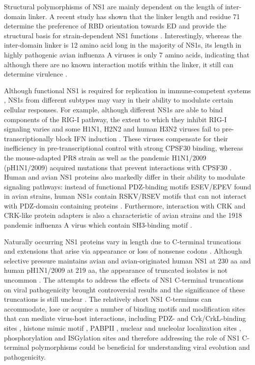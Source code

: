 		Structural polymorphisms of \gls{NS1} are mainly dependent on the length of inter-domain linker. A recent study has shown that the linker length and residue 71 determine the preference of \gls{RBD} orientation towards \gls{ED} and provide the structural basis for strain-dependent \gls{NS1} functions \parencite{Carrillo2014}. Interestingly, whereas the inter-domain linker is 12 amino acid long in the majority of \gls{NS1}s, its length in highly pathogenic avian influenza A viruses is only 7 amino acids, indicating that although there are no known interaction motifs within the linker, it still can determine virulence \parencite{Long2008}.
		
		Although functional \gls{NS1} is required for replication in immune-competent systems \parencite{Garcia-Sastre1998, Donelan2003}, \gls{NS1}s from different subtypes may vary in their ability to modulate certain cellular responses. For example, although different \gls{NS1}s are able to bind components of the \gls{RIG-I} pathway, the extent to which they inhibit \gls{RIG-I} signaling varies and some H1N1, H2N2 and human H3N2 viruses fail to pre-transcriptionally block \gls{IFN} induction \parencite{Kochs2007, Haye2009, Munir2011a, Munir2012}. These viruses compensate for their inefficiency in pre-transcriptional control with strong \gls{CPSF}30 binding, whereas the mouse-adapted PR8 strain as well as the pandemic H1N1/2009 (pH1N1/2009) acquired mutations that prevent interactions with \gls{CPSF}30 \parencite{Kochs2007, Hale2010d}. Human and avian \gls{NS1} proteins also markedly differ in their ability to modulate signaling pathways: instead of functional PDZ-binding motifs ESEV/EPEV found in avian strains, human NS1s contain RSKV/RSEV motifs that can not interact with PDZ-domain containing proteins \parencite{Liu2010}. Furthermore, interaction with CRK and CRK-like protein adapters is also a characteristic of avian strains and the 1918 pandemic influenza A virus which contain SH3-binding motif \parencite{Heikkinen2008}.
		
		Naturally occurring \gls{NS1} proteins vary in length due to C-terminal truncations and extensions that arise via appearance or loss of nonsense codons \parencite{Parvin1983}. Although selective pressure maintains avian and avian-originated human \gls{NS1} at 230 aa and human pH1N1/2009 at 219 aa, the appearance of truncated isolates is not uncommon \parencite{Suarez1998, Lakspere2014}. The attempts to address the effects of \gls{NS1} C-terminal truncations on viral pathogenicity brought controversial results and the significance of these truncations is still unclear \parencite{Hale2010e, Tu2011a}. The relatively short NS1 C-terminus can accommodate, lose or acquire a number of binding motifs and modification sites that can mediate virus-host interactions, including PDZ- and Crk/CrkL-binding sites \parencite{Heikkinen2008, Liu2010}, histone mimic motif \parencite{Marazzi2012}, \gls{PABP}II  \parencite{Li2001a}, nuclear and nucleolar localization sites \parencite{Melen2012}, phosphorylation \parencite{Hsiang2012} and \gls{ISG}ylation sites \parencite{Hsiang2009} and therefore addressing the role of NS1 C-terminal polymorphisms could be beneficial for understanding viral evolution and pathogenicity.
		
